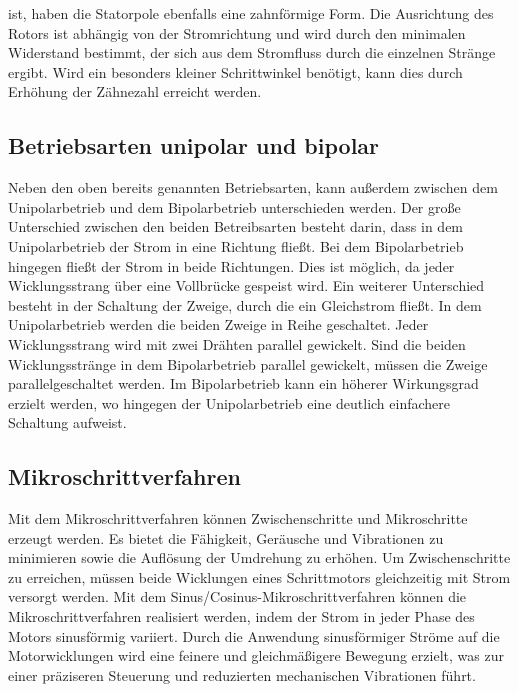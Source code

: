 ist, haben die Statorpole ebenfalls eine zahnförmige Form. Die Ausrichtung des Rotors ist abhängig von der Stromrichtung und wird durch den minimalen Widerstand bestimmt, der sich aus dem Stromfluss durch die einzelnen Stränge ergibt. Wird ein besonders kleiner Schrittwinkel benötigt, kann dies durch Erhöhung der Zähnezahl erreicht werden. \cite{Schroeder:2021,Hagl:2021,Babiel:2023}

\subsection{Betriebsarten unipolar und bipolar}

Neben den oben bereits genannten Betriebsarten, kann außerdem zwischen dem Unipolarbetrieb und dem Bipolarbetrieb unterschieden werden. Der große Unterschied zwischen den beiden Betreibsarten besteht darin, dass in dem Unipolarbetrieb der Strom in eine Richtung fließt. Bei dem Bipolarbetrieb hingegen fließt der Strom in beide Richtungen. Dies ist möglich, da jeder Wicklungsstrang über eine Vollbrücke gespeist wird. Ein weiterer Unterschied besteht in der Schaltung der Zweige, durch die ein Gleichstrom fließt. In dem Unipolarbetrieb werden die beiden Zweige in Reihe geschaltet. Jeder Wicklungsstrang wird mit zwei Drähten parallel gewickelt. Sind die beiden Wicklungsstränge in dem Bipolarbetrieb parallel gewickelt, müssen die Zweige parallelgeschaltet werden. Im Bipolarbetrieb kann ein höherer Wirkungsgrad erzielt werden, wo hingegen der Unipolarbetrieb eine deutlich einfachere Schaltung aufweist. \cite{Schroeder:2021}

\subsection{Mikroschrittverfahren}

Mit dem Mikroschrittverfahren können Zwischenschritte und Mikroschritte erzeugt werden. Es bietet die Fähigkeit, Geräusche und Vibrationen zu minimieren sowie die Auflösung der Umdrehung zu erhöhen. Um Zwischenschritte zu erreichen, müssen beide Wicklungen eines Schrittmotors gleichzeitig mit Strom versorgt werden. 
Mit dem Sinus/Cosinus-Mikroschrittverfahren können die Mikroschrittverfahren realisiert werden, indem der Strom in jeder Phase des Motors sinusförmig variiert. Durch die Anwendung sinusförmiger Ströme auf die Motorwicklungen wird eine feinere und gleichmäßigere Bewegung erzielt, was zur einer präziseren Steuerung und reduzierten mechanischen Vibrationen führt.\cite{McComb:2024}

